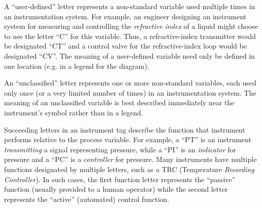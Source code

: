 A ``user-defined'' letter represents a non-standard variable used multiple times in an instrumentation system.  For example, an engineer designing an instrument system for measuring and controlling the \textit{refractive index} of a liquid might choose to use the letter ``C'' for this variable.  Thus, a refractive-index transmitter would be designated ``CT'' and a control valve for the refractive-index loop would be designated ``CV''.  The meaning of a user-defined variable need only be defined in one location (e.g. in a legend for the diagram).

An ``unclassified'' letter represents one or more non-standard variables, each used only once (or a very limited number of times) in an instrumentation system.  The meaning of an unclassified variable is best described immediately near the instrument's symbol rather than in a legend.

\filbreak

Succeeding letters in an instrument tag describe the function that instrument performs relative to the process variable.  For example, a ``PT'' is an instrument \textit{transmitting} a signal representing pressure, while a ``PI'' is an \textit{indicator} for pressure and a ``PC'' is a \textit{controller} for pressure.  Many instruments have multiple functions designated by multiple letters, such as a TRC (Temperature \textit{Recording} \textit{Controller}).  In such cases, the first function letter represents the ``passive'' function (usually provided to a human operator) while the second letter represents the ``active'' (automated) control function.


